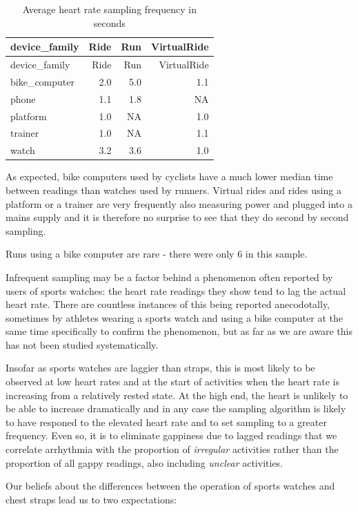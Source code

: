 \documentclass[
  letterpaper,
  DIV=11,
  numbers=noendperiod]{scrartcl}
\begin{document}
\begin{longtable}[]{@{}lrrr@{}}
\caption{Average heart rate sampling frequency in
seconds}\tabularnewline
\toprule\noalign{}
device\_family & Ride & Run & VirtualRide \\
\midrule\noalign{}
\endfirsthead
\toprule\noalign{}
device\_family & Ride & Run & VirtualRide \\
\midrule\noalign{}
\endhead
\bottomrule\noalign{}
\endlastfoot
bike\_computer & 2.0 & 5.0 & 1.1 \\
phone & 1.1 & 1.8 & NA \\
platform & 1.0 & NA & 1.0 \\
trainer & 1.0 & NA & 1.1 \\
watch & 3.2 & 3.6 & 1.0 \\
\end{longtable}

As expected, bike computers used by cyclists have a much lower median
time between readings than watches used by runners. Virtual rides and
rides using a platform or a trainer are very frequently also measuring
power and plugged into a mains supply and it is therefore no surprise to
see that they do second by second sampling.

Runs using a bike computer are rare - there were only 6 in this sample.

Infrequent sampling may be a factor behind a phenomenon often reported
by users of sports watches: the heart rate readings they show tend to
lag the actual heart rate. There are countless instances of this being
reported anecodotally, sometimes by athletes wearing a sports watch and
using a bike computer at the same time specifically to confirm the
phenomenon, but as far as we are aware this has not been studied
systematically.

Insofar as sports watches are laggier than straps, this is most likely
to be observed at low heart rates and at the start of activities when
the heart rate is increasing from a relatively rested state. At the high
end, the heart is unlikely to be able to increase dramatically and in
any case the sampling algorithm is likely to have responed to the
elevated heart rate and to set sampling to a greater frequency. Even so,
it is to eliminate gappiness due to lagged readings that we correlate
arrhythmia with the proportion of \emph{irregular} activities rather
than the proportion of all gappy readings, also including \emph{unclear}
activities.

Our beliefs about the differences between the operation of sports
watches and chest straps lead us to two expectations:
\end{document}
